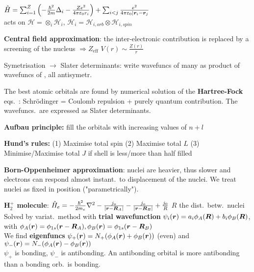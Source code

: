 \begin{squishlist}
    \item $\hat{H} = \sum_{i=1}^{Z}\left( - \frac{\hbar^2}{2m}\Delta_i - \frac{Ze^2}{4\pi \varepsilon_0 r_i}\right) + \sum_{i < j} \frac{e^2}{4\pi \varepsilon_0 |\bm{r}_i - \bm{r}_j}$ \\
    acts on $\mathcal{H} = \otimes_i \mathcal{H}_i,\, \mathcal{H}_i =  \mathcal{H}_{i, orb} \otimes \mathcal{H}_{i, spin}$
    \item \textbf{Central field approximation}: the inter-electronic contribution is replaced by a screening of the nucleus $\Rightarrow Z_{\mathrm{eff}}$ \quad $V(r) \sim \frac{Z(r)}{r}$
    \item Symetrisation $\rightarrow$ Slater determinants: write wavefuncs of many \elec as product of wavefuncs of \elec, all antisymetr.
    \item The best atomic orbitals are found by numerical solution of the \textbf{Hartree-Fock} eqs.\ : Schrödinger = Coulomb repulsion + purely quantum contribution.
    The wavefuncs.\ are expressed as Slater determinants.

    \item \textbf{Aufbau principle:} fill the orbitals with increasing values of $n+l$
    \item \textbf{Hund's rules:} (1) Maximise total spin (2) Maximise total $L$ (3) Minimise/Maximise total $J$ if shell is less/more than half filled
\end{squishlist}

\textbf{Born-Oppenheimer approximation}: nuclei are heavier, thus slower and electrons can respond almost instant.\ to displacement of the nuclei. We treat nuclei as fixed in position ("parametrically").

\squishline

\begin{squishlist}
    \item \textbf{H$_2^+$ molecule}: $\hat{H}_e = - \frac{\hbar^2}{2m_e} \nabla^2 - \frac{j_o}{|\bm{r} - \bm{R}_A|} - \frac{j_o}{|\bm{r} - \bm{R}_B|} + \frac{j_0}{R}$ \quad $R$ the dist.\ betw.\ nuclei \\
    Solved by variat.\ method with \textbf{trial wavefunction} $\psi_i(\bm{r}) = a_i \phi_A(\bm{R}) + b_i \phi_B(\bm{R})$, with $\phi_A(\bm{r})=\phi_{1s}(\bm{r} - \bm{R}_A), \phi_B(\bm{r})=\phi_{1s}(\bm{r} - \bm{R}_B)$ \\
    We find \textbf{eigenfuncs} $\psi_+(\bm{r}) = N_+ (\phi_A(\bm{r})+\phi_B(\bm{r}))$ (even) and $\psi_-(\bm{r}) = N_- (\phi_A(\bm{r})-\phi_B(\bm{r}))$ \\
    $\psi_+$ is bonding, $\psi_-$ is antibonding. An antibonding orbital is more antibonding than a bonding orb.\ is bonding.
\end{squishlist}

